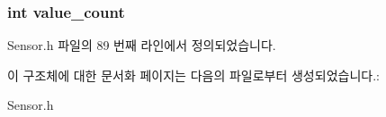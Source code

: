 \hypertarget{struct__Temperature__data_a40a079bfc72408819dc78da308203a74}{
\subsubsection[{value\-\_\-count}]{\setlength{\rightskip}{0pt plus 5cm}int value\-\_\-count}}\label{struct__Temperature__data_a40a079bfc72408819dc78da308203a74}


Sensor.\-h 파일의 89 번째 라인에서 정의되었습니다.



이 구조체에 대한 문서화 페이지는 다음의 파일로부터 생성되었습니다.\-:\begin{DoxyCompactItemize}
\item 
Sensor.\-h\end{DoxyCompactItemize}
